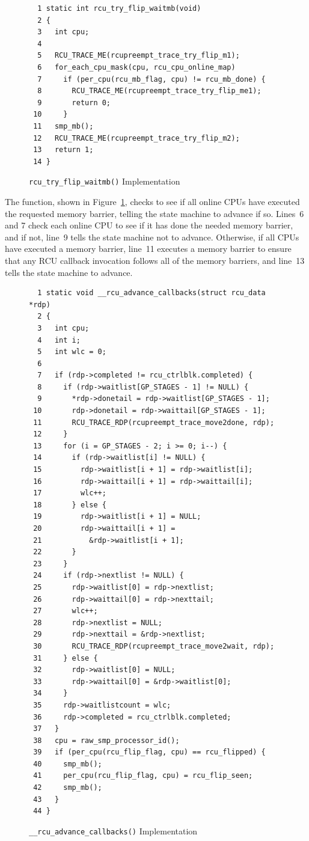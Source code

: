 \begin{figure}[tbp]
{ \scriptsize
\begin{verbatim}
  1 static int rcu_try_flip_waitmb(void)
  2 {
  3   int cpu;
  4
  5   RCU_TRACE_ME(rcupreempt_trace_try_flip_m1);
  6   for_each_cpu_mask(cpu, rcu_cpu_online_map)
  7     if (per_cpu(rcu_mb_flag, cpu) != rcu_mb_done) {
  8       RCU_TRACE_ME(rcupreempt_trace_try_flip_me1);
  9       return 0;
 10     }
 11   smp_mb();
 12   RCU_TRACE_ME(rcupreempt_trace_try_flip_m2);
 13   return 1;
 14 }
\end{verbatim}
}
\caption{{\tt rcu\_try\_flip\_waitmb()} Implementation}
\label{fig:app:rcuimpl:rcu_try_flip_waitmb() Implementation}
\end{figure}

The  function, shown in
Figure~\ref{fig:app:rcuimpl:rcu_try_flip_waitmb() Implementation},
checks to see
if all online CPUs have executed the requested memory barrier,
telling the state machine to advance if so.
Lines~6 and 7 check each online CPU to see if it has
done the needed memory barrier, and if not, line~9 tells
the state machine not to advance.
Otherwise, if all CPUs have executed a memory barrier, line~11
executes a memory barrier to ensure that any RCU callback invocation
follows all of the memory barriers, and line~13 tells the
state machine to advance.

\begin{figure}[tbp]
{ \scriptsize
\begin{verbatim}
  1 static void __rcu_advance_callbacks(struct rcu_data *rdp)
  2 {
  3   int cpu;
  4   int i;
  5   int wlc = 0;
  6
  7   if (rdp->completed != rcu_ctrlblk.completed) {
  8     if (rdp->waitlist[GP_STAGES - 1] != NULL) {
  9       *rdp->donetail = rdp->waitlist[GP_STAGES - 1];
 10       rdp->donetail = rdp->waittail[GP_STAGES - 1];
 11       RCU_TRACE_RDP(rcupreempt_trace_move2done, rdp);
 12     }
 13     for (i = GP_STAGES - 2; i >= 0; i--) {
 14       if (rdp->waitlist[i] != NULL) {
 15         rdp->waitlist[i + 1] = rdp->waitlist[i];
 16         rdp->waittail[i + 1] = rdp->waittail[i];
 17         wlc++;
 18       } else {
 19         rdp->waitlist[i + 1] = NULL;
 20         rdp->waittail[i + 1] =
 21           &rdp->waitlist[i + 1];
 22       }
 23     }
 24     if (rdp->nextlist != NULL) {
 25       rdp->waitlist[0] = rdp->nextlist;
 26       rdp->waittail[0] = rdp->nexttail;
 27       wlc++;
 28       rdp->nextlist = NULL;
 29       rdp->nexttail = &rdp->nextlist;
 30       RCU_TRACE_RDP(rcupreempt_trace_move2wait, rdp);
 31     } else {
 32       rdp->waitlist[0] = NULL;
 33       rdp->waittail[0] = &rdp->waitlist[0];
 34     }
 35     rdp->waitlistcount = wlc;
 36     rdp->completed = rcu_ctrlblk.completed;
 37   }
 38   cpu = raw_smp_processor_id();
 39   if (per_cpu(rcu_flip_flag, cpu) == rcu_flipped) {
 40     smp_mb();
 41     per_cpu(rcu_flip_flag, cpu) = rcu_flip_seen;
 42     smp_mb();
 43   }
 44 }
\end{verbatim}
}
\caption{{\tt \_\_rcu\_advance\_callbacks()} Implementation}
\label{fig:app:rcuimpl:__rcu_advance_callbacks() Implementation}
\end{figure}


